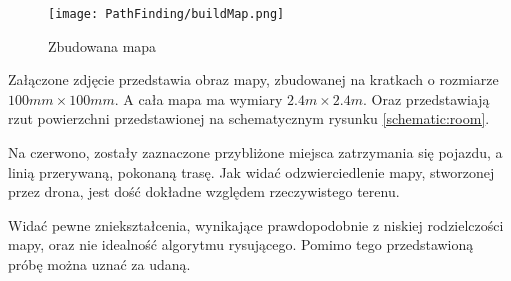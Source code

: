             \begin{figure}[!ht]
                \centering
                \texttt{[image: PathFinding/buildMap.png]}
                \caption{Zbudowana mapa}
                \label{fig:buildMap}
            \end{figure}

            Załączone zdjęcie przedstawia obraz mapy, zbudowanej na kratkach o rozmiarze $100mm \times 100mm$.
            A cała mapa ma wymiary $ 2.4m \times 2.4m$.
            Oraz przedstawiają rzut powierzchni przedstawionej na schematycznym rysunku \ref{schematic:room}.
            
            

            Na czerwono, zostały zaznaczone przybliżone miejsca zatrzymania się pojazdu, a linią przerywaną, pokonaną trasę.
            Jak widać odzwierciedlenie mapy, stworzonej przez drona, jest dość dokładne względem rzeczywistego terenu.

            Widać pewne zniekształcenia, wynikające prawdopodobnie z niskiej rodzielczości mapy, oraz nie idealność algorytmu rysującego.
            Pomimo tego przedstawioną próbę można uznać za udaną.
            

            